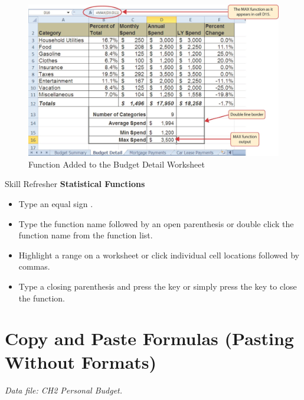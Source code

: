 \begin{figure}[H]
	\centering
	\includegraphics[width=\maxwidth{.95\linewidth}]{gfx/ch02_fig25}
	\caption{ Function Added to the Budget Detail Worksheet}
	\label{02:fig25}
\end{figure}

\begin{center}
	\begin{sklbox}{Skill Refresher}
		\textbf{Statistical Functions}
		\\
		\begin{itemize}
			\setlength{\itemsep}{0pt}
			\setlength{\parskip}{0pt}
			\setlength{\parsep}{0pt}

			\item Type an equal sign \fmtTyping{=}.
			\item Type the function name followed by an open parenthesis \fmtTyping{(} or double click the function name from the function list.
			\item Highlight a range on a worksheet or click individual cell locations followed by commas.
			\item Type a closing parenthesis \fmtTyping{)} and press the  key or simply press the  key to close the function.
			
		\end{itemize}
	\end{sklbox}
\end{center}

\section{Copy and Paste Formulas (Pasting Without Formats)}

\textit{Data file: CH2 Personal Budget.}

